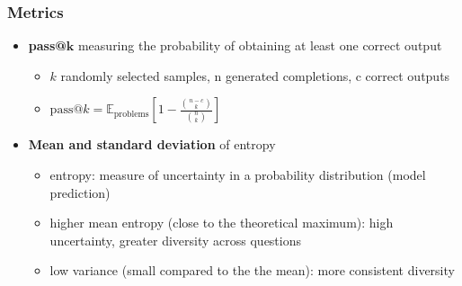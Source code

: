 \documentclass[student, noshadow, lsr, english, aspectratio=169]{ITR_LSR_slides}
\begin{document}
\begin{frame}
	\frametitle{Metrics}
	\begin{itemize}
		\item \textbf{pass@$\mathbf{k}$} measuring the probability of obtaining at least one correct output
		\begin{itemize}
			\item $k$ randomly selected samples, n generated completions, c correct outputs
			\item $\text{pass}@k = \mathbb{E}_{\text{problems}} \left[ 1 - \frac{\binom{n-c}{k}}{\binom{n}{k}} \right]$
		\end{itemize}
		\item \textbf{Mean and standard deviation} of entropy
		\begin{itemize}
			\item entropy: measure of uncertainty in a probability distribution (model prediction)
			\item higher mean entropy (close to the theoretical maximum): high uncertainty, greater diversity across questions
			\item low variance (small compared to the the mean): more consistent diversity
		\end{itemize}
	\end{itemize}
\end{frame}
\end{document}
